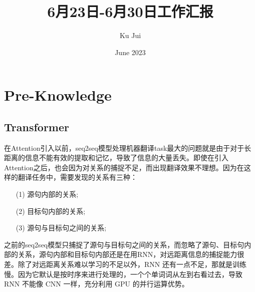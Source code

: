 \documentclass[letterpaper,10pt]{article}
\begin{document}
	
	
	\title{\songti {}6月23日-6月30日工作汇报}
	\author{\textrm{Ku Jui}}
	\date{\textrm{June 2023}}
	\maketitle
	
	\renewcommand{\figurename}{Figure} %
	\renewcommand{\contentsname}{Contents}
	\renewcommand{\tablename}{Table}
	\tableofcontents  %
	
	\section{Pre-Knowledge}
		
	\subsection{Transformer}
	
	在Attention引入以前，seq2seq模型处理机器翻译task最大的问题就是由于对于长距离的信息不能有效的提取和记忆，导致了信息的大量丢失。即使在引入Attention之后，也会因为对关系的捕捉不足，而出现翻译效果不理想。因为在这样的翻译任务中，需要发现的关系有三种：
	
	\begin{itemize}
		\item [(1)]
			源句内部的关系;
		\item [(2)]
			目标句内部的关系;
		\item [(3)]
			源句与目标句之间的关系;
	\end{itemize}
	
	之前的seq2seq模型只捕捉了源句与目标句之间的关系，而忽略了源句、目标句内部的关系，源句内部和目标句内部还是在用RNN，对远距离信息的捕捉能力很差。除了对远距离关系难以学习的不足以外，RNN 还有一点不足，那就是训练慢。因为它默认是按时序来进行处理的，一个个单词词从左到右看过去，导致 RNN 不能像 CNN 一样，充分利用 GPU 的并行运算优势。
	
\end{document}

